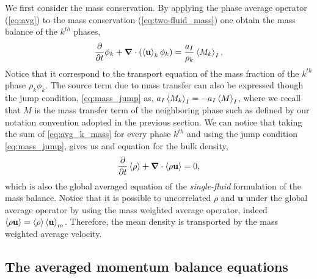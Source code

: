 We first consider the mass conservation. 
By applying the phase average operator (\ref{eq:avg}) to the mass conservation (\ref{eq:two-fluid_mass}) one obtain the mass balance of the $k^{th}$ phases, 
\begin{equation}
    \frac{\partial}{\partial t} \phi_k 
    + \bm{\nabla} \cdot \left(
        \left<\textbf{u}\right>_k\phi_k 
    \right) 
    = \frac{a_I}{\rho_k}\left<M_k\right>_I,
    \label{eq:avg_k_mass}
\end{equation}
Notice that it correspond to the transport equation of the mass fraction of the 
$k^{th}$ phase $\rho_k \phi_k$. 
The source term due to mass transfer can also be expressed though the jump condition, 
\ref{eq:mass_jump} as, $a_I\left<M_k\right>_I = - a_I\left<M\right>_I$, where we recall that $M$ is the mass transfer term of the neighboring phase such as defined by our notation convention adopted in the previous section. 
We can notice that taking the sum of \ref{eq:avg_k_mass} for every phase $k^{th}$ and using the jump condition \ref{eq:mass_jump}, gives us and equation for the bulk density,
\begin{equation}
    \frac{\partial}{\partial t} \left<\rho\right>
    + \bm{\nabla} \cdot 
        \left<\rho\textbf{u}\right> 
    = 0,
    \label{eq:avg_mass}
\end{equation}
which is also the global averaged equation of the \textit{single-fluid} formulation of the mass balance. 
Notice that it is possible to uncorrelated $\rho$ and $\textbf{u}$ under the global average operator by using the mass weighted average operator, indeed $\left<\rho\textbf{u}\right> = \left<\rho\right>\left<\textbf{u}\right>_m$.
Therefore, the mean density is transported by the mass weighted average velocity. 

\subsection{The averaged momentum balance equations}

